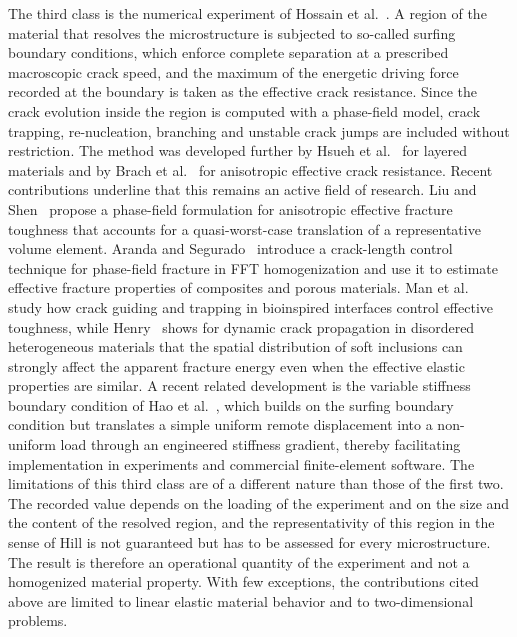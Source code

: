\documentclass[pdflatex,sn-mathphys-num]{sn-jnl}%
\theoremstyle{thmstyleone}%
\theoremstyle{thmstyletwo}%
\theoremstyle{thmstylethree}%
\begin{document}
The third class is the numerical experiment of Hossain et al.~\cite{hossain_effective_2014}. A region of the material that resolves the microstructure is subjected to so-called surfing boundary conditions, which enforce complete separation at a prescribed macroscopic crack speed, and the maximum of the energetic driving force recorded at the boundary is taken as the effective crack resistance. Since the crack evolution inside the region is computed with a phase-field model, crack trapping, re-nucleation, branching and unstable crack jumps are included without restriction. The method was developed further by Hsueh et al.~\cite{hsueh_stress_2018} for layered materials and by Brach et al.~\cite{brach_anisotropy_2019} for anisotropic effective crack resistance.
Recent contributions underline that this remains an active field of research. Liu and Shen~\cite{liu_effective_2025} propose a phase-field formulation for anisotropic effective fracture toughness that accounts for a quasi-worst-case translation of a representative volume element. Aranda and Segurado~\cite{aranda_cracklength_2025} introduce a crack-length control technique for phase-field fracture in FFT homogenization and use it to estimate effective fracture properties of composites and porous materials. Man et al.~\cite{man_collaborative_2025} study how crack guiding and trapping in bioinspired interfaces control effective toughness, while Henry~\cite{henry_phasefield_2025} shows for dynamic crack propagation in disordered heterogeneous materials that the spatial distribution of soft inclusions can strongly affect the apparent fracture energy even when the effective elastic properties are similar.
A recent related development is the variable stiffness boundary condition of Hao et al.~\cite{hao_variable_2026}, which builds on the surfing boundary condition but translates a simple uniform remote displacement into a non-uniform load through an engineered stiffness gradient, thereby facilitating implementation in experiments and commercial finite-element software. The limitations of this third class are of a different nature than those of the first two. The recorded value depends on the loading of the experiment and on the size and the content of the resolved region, and the representativity of this region in the sense of Hill is not guaranteed but has to be assessed for every microstructure. The result is therefore an operational quantity of the experiment and not a homogenized material property. With few exceptions, the contributions cited above are limited to linear elastic material behavior and to two-dimensional problems.
\end{document}
